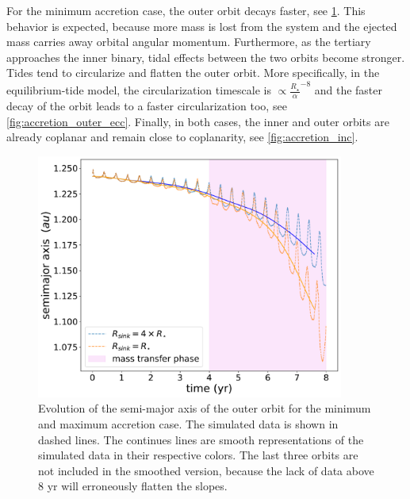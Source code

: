 For the minimum accretion case, the outer orbit decays faster, see \cref{fig:accretion_outer_semimajor_axis}. This behavior is expected, because more mass is lost from the system and the ejected mass carries away orbital angular momentum. Furthermore, as the tertiary approaches the inner binary, tidal effects between the two orbits become stronger. Tides tend to circularize and flatten the outer orbit. More specifically, in the equilibrium-tide model, the circularization timescale is $\propto \frac{R_{\star}}{\alpha}^{-8}$ and the faster decay of the orbit leads to a faster circularization too, see \cref{fig:accretion_outer_ecc}. Finally, in both cases, the inner and outer orbits are already coplanar and remain close to coplanarity, see \cref{fig:accretion_inc}.
\begin{figure}[H]
    \centering
    \includegraphics[width=0.9\textwidth]{Thesis/graphs/accretion_case/accretion_outer_semimajor_axis.pdf}
    \caption{Evolution of the semi-major axis of the outer orbit for the minimum and maximum accretion case. The simulated data is shown in dashed lines. The continues lines are smooth representations of the simulated data in their respective colors. The last three orbits are not included in the smoothed version, because the lack of data above $8$ yr will erroneously flatten the slopes.}
    \label{fig:accretion_outer_semimajor_axis}
\end{figure}
